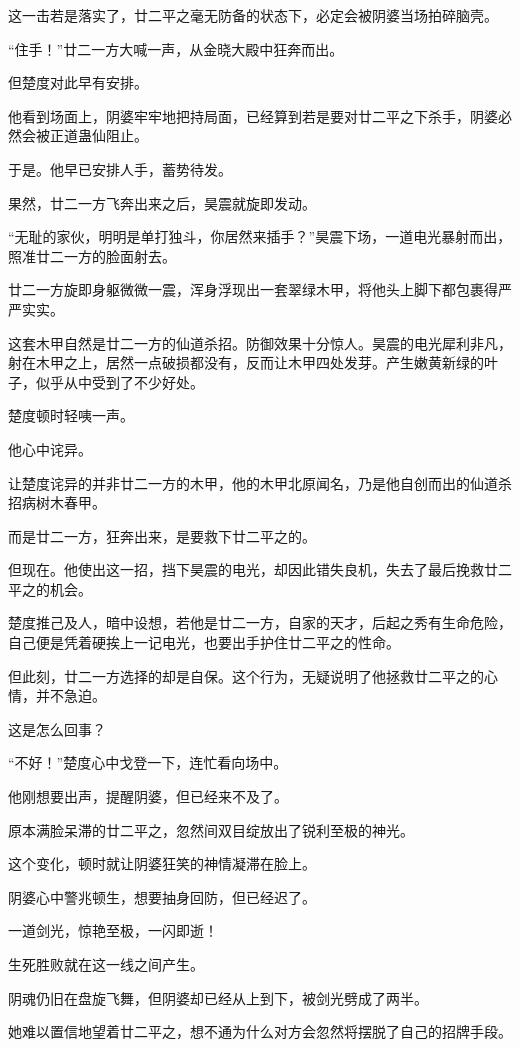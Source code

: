 \begin{this_body}
这一击若是落实了，廿二平之毫无防备的状态下，必定会被阴婆当场拍碎脑壳。

“住手！”廿二一方大喊一声，从金晓大殿中狂奔而出。

但楚度对此早有安排。

他看到场面上，阴婆牢牢地把持局面，已经算到若是要对廿二平之下杀手，阴婆必然会被正道蛊仙阻止。

于是。他早已安排人手，蓄势待发。

果然，廿二一方飞奔出来之后，昊震就旋即发动。

“无耻的家伙，明明是单打独斗，你居然来插手？”昊震下场，一道电光暴射而出，照准廿二一方的脸面射去。

廿二一方旋即身躯微微一震，浑身浮现出一套翠绿木甲，将他头上脚下都包裹得严严实实。

这套木甲自然是廿二一方的仙道杀招。防御效果十分惊人。昊震的电光犀利非凡，射在木甲之上，居然一点破损都没有，反而让木甲四处发芽。产生嫩黄新绿的叶子，似乎从中受到了不少好处。

楚度顿时轻咦一声。

他心中诧异。

让楚度诧异的并非廿二一方的木甲，他的木甲北原闻名，乃是他自创而出的仙道杀招病树木春甲。

而是廿二一方，狂奔出来，是要救下廿二平之的。

但现在。他使出这一招，挡下昊震的电光，却因此错失良机，失去了最后挽救廿二平之的机会。

楚度推己及人，暗中设想，若他是廿二一方，自家的天才，后起之秀有生命危险，自己便是凭着硬挨上一记电光，也要出手护住廿二平之的性命。

但此刻，廿二一方选择的却是自保。这个行为，无疑说明了他拯救廿二平之的心情，并不急迫。

这是怎么回事？

“不好！”楚度心中戈登一下，连忙看向场中。

他刚想要出声，提醒阴婆，但已经来不及了。

原本满脸呆滞的廿二平之，忽然间双目绽放出了锐利至极的神光。

这个变化，顿时就让阴婆狂笑的神情凝滞在脸上。

阴婆心中警兆顿生，想要抽身回防，但已经迟了。

一道剑光，惊艳至极，一闪即逝！

生死胜败就在这一线之间产生。

阴魂仍旧在盘旋飞舞，但阴婆却已经从上到下，被剑光劈成了两半。

她难以置信地望着廿二平之，想不通为什么对方会忽然将摆脱了自己的招牌手段。


\end{this_body}
